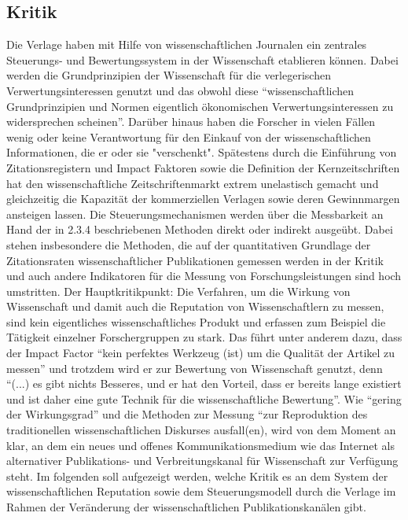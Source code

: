 \subsection{Kritik}
Die Verlage haben mit Hilfe von wissenschaftlichen Journalen ein zentrales Steuerungs- und Bewertungssystem in der Wissenschaft etablieren können. Dabei werden die Grundprinzipien der Wissenschaft für die verlegerischen Verwertungsinteressen genutzt und das obwohl diese “wissenschaftlichen Grundprinzipien und Normen eigentlich ökonomischen Verwertungsinteressen zu widersprechen scheinen”\cite{hanekop_2006}. Darüber hinaus haben die Forscher in vielen Fällen wenig oder keine Verantwortung für den Einkauf von der wissenschaftlichen Informationen, die er oder sie "verschenkt"\cite{steele_2006}. Spätestens durch die Einführung von Zitationsregistern und Impact Faktoren sowie die Definition der Kernzeitschriften hat den wissenschaftliche Zeitschriftenmarkt extrem unelastisch gemacht und gleichzeitig die Kapazität der kommerziellen Verlagen sowie deren Gewinnmargen ansteigen lassen.\cite{CREATe_2014} Die Steuerungsmechanismen werden über die Messbarkeit an Hand der in 2.3.4 beschriebenen Methoden direkt oder indirekt ausgeübt. Dabei stehen insbesondere die Methoden, die auf der quantitativen Grundlage der Zitationsraten wissenschaftlicher Publikationen gemessen werden in der Kritik\cite{Dong_2005} und auch andere Indikatoren für die Messung von Forschungsleistungen sind hoch umstritten\cite{Hornbostel_1997}\cite{Hicks_1996}\cite{Havemann_2002}. Der Hauptkritikpunkt: Die Verfahren, um die Wirkung von Wissenschaft und damit auch die Reputation von Wissenschaftlern zu messen, sind kein eigentliches wissenschaftliches Produkt\cite{suchen} und erfassen zum Beispiel die Tätigkeit einzelner Forschergruppen zu stark\cite{schmoch_2009}. Das führt unter anderem dazu, dass der Impact Factor “kein perfektes Werkzeug (ist) um die Qualität der Artikel zu messen” und trotzdem wird er zur Bewertung von Wissenschaft genutzt, denn “(...) es gibt nichts Besseres, und er hat den Vorteil, dass er bereits lange existiert und ist daher eine gute Technik für die wissenschaftliche Bewertung”\cite{garfield_1999}. Wie “gering der Wirkungsgrad” und die Methoden zur Messung “zur Reproduktion des traditionellen wissenschaftlichen Diskurses ausfall(en), wird von dem Moment an klar, an dem ein neues und offenes Kommunikationsmedium wie das Internet als alternativer Publikations- und Verbreitungskanal für Wissenschaft zur Verfügung steht\cite{Rost_1998}. Im folgenden soll aufgezeigt werden, welche Kritik es an dem System der wissenschaftlichen Reputation sowie dem Steuerungsmodell durch die Verlage im Rahmen der Veränderung der wissenschaftlichen Publikationskanälen gibt.
